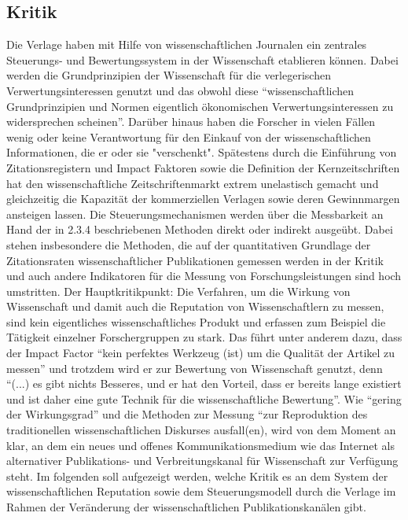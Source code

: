 \subsection{Kritik}
Die Verlage haben mit Hilfe von wissenschaftlichen Journalen ein zentrales Steuerungs- und Bewertungssystem in der Wissenschaft etablieren können. Dabei werden die Grundprinzipien der Wissenschaft für die verlegerischen Verwertungsinteressen genutzt und das obwohl diese “wissenschaftlichen Grundprinzipien und Normen eigentlich ökonomischen Verwertungsinteressen zu widersprechen scheinen”\cite{hanekop_2006}. Darüber hinaus haben die Forscher in vielen Fällen wenig oder keine Verantwortung für den Einkauf von der wissenschaftlichen Informationen, die er oder sie "verschenkt"\cite{steele_2006}. Spätestens durch die Einführung von Zitationsregistern und Impact Faktoren sowie die Definition der Kernzeitschriften hat den wissenschaftliche Zeitschriftenmarkt extrem unelastisch gemacht und gleichzeitig die Kapazität der kommerziellen Verlagen sowie deren Gewinnmargen ansteigen lassen.\cite{CREATe_2014} Die Steuerungsmechanismen werden über die Messbarkeit an Hand der in 2.3.4 beschriebenen Methoden direkt oder indirekt ausgeübt. Dabei stehen insbesondere die Methoden, die auf der quantitativen Grundlage der Zitationsraten wissenschaftlicher Publikationen gemessen werden in der Kritik\cite{Dong_2005} und auch andere Indikatoren für die Messung von Forschungsleistungen sind hoch umstritten\cite{Hornbostel_1997}\cite{Hicks_1996}\cite{Havemann_2002}. Der Hauptkritikpunkt: Die Verfahren, um die Wirkung von Wissenschaft und damit auch die Reputation von Wissenschaftlern zu messen, sind kein eigentliches wissenschaftliches Produkt\cite{suchen} und erfassen zum Beispiel die Tätigkeit einzelner Forschergruppen zu stark\cite{schmoch_2009}. Das führt unter anderem dazu, dass der Impact Factor “kein perfektes Werkzeug (ist) um die Qualität der Artikel zu messen” und trotzdem wird er zur Bewertung von Wissenschaft genutzt, denn “(...) es gibt nichts Besseres, und er hat den Vorteil, dass er bereits lange existiert und ist daher eine gute Technik für die wissenschaftliche Bewertung”\cite{garfield_1999}. Wie “gering der Wirkungsgrad” und die Methoden zur Messung “zur Reproduktion des traditionellen wissenschaftlichen Diskurses ausfall(en), wird von dem Moment an klar, an dem ein neues und offenes Kommunikationsmedium wie das Internet als alternativer Publikations- und Verbreitungskanal für Wissenschaft zur Verfügung steht\cite{Rost_1998}. Im folgenden soll aufgezeigt werden, welche Kritik es an dem System der wissenschaftlichen Reputation sowie dem Steuerungsmodell durch die Verlage im Rahmen der Veränderung der wissenschaftlichen Publikationskanälen gibt.
